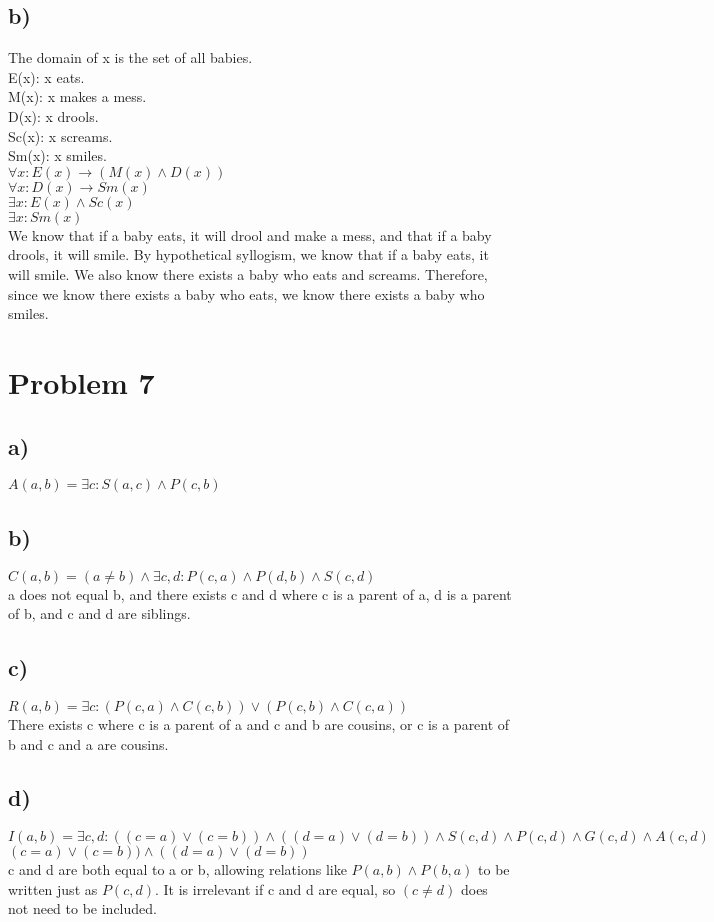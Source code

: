 \documentclass{article}
\begin{document}
\subsection*{b)}
The domain of x is the set of all babies.\\
E(x): x eats.\\
M(x): x makes a mess.\\
D(x): x drools.\\
Sc(x): x screams.\\
Sm(x): x smiles.\\
$\forall x: E(x) \rightarrow (M(x)\land D(x))$\\
$\forall x: D(x) \rightarrow Sm(x)$\\
$\exists x: E(x) \land Sc(x)$\\
$\exists x: Sm(x)$\\
We know that if a baby eats, it will drool and make a mess, and that if a baby drools, it will smile. By hypothetical syllogism, we know that if a baby eats, it will smile. We also know there exists a baby who eats and screams. Therefore, since we know there exists a baby who eats, we know there exists a baby who smiles.
\section*{Problem 7}
\subsection*{a)}
$A(a,b)=\exists c : S(a,c) \land P(c,b)$
\subsection*{b)}
$C(a,b)=(a \neq b)\land\exists c,d: P(c,a)\land P(d,b) \land S(c,d)$\\
a does not equal b, and there exists c and d where c is a parent of a, d is a parent of b, and c and d are siblings.
\subsection*{c)}
$R(a,b)=\exists c:(P(c,a)\land C(c,b))\lor (P(c,b)\land C(c,a))$\\
There exists c where c is a parent of a and c and b are cousins, or c is a parent of b and c and a are cousins.
\subsection*{d)}
$I(a,b)=\exists c,d:((c=a)\lor (c=b))\land ((d=a)\lor (d=b))\land S(c,d)\land P(c,d)\land G(c,d)\land A(c,d)$\\
$(c=a)\lor (c=b))\land ((d=a)\lor (d=b))$\\
c and d are both equal to a or b, allowing relations like $P(a,b)\land P(b,a)$ to be written just as $P(c,d)$. It is irrelevant if c and d are equal, so $(c \neq d)$ does not need to be included.
\end{document}
